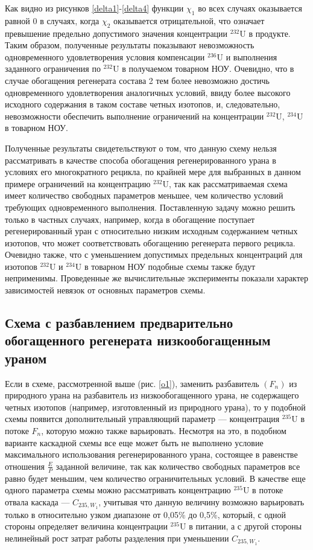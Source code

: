 Как видно из рисунков \ref{delta1}-\ref{delta4} функции $\chi_1$ во всех случаях оказывается равной 0 в случаях, когда $\chi_2$ оказывается отрицательной, что означает превышение предельно допустимого значения концентрации $^{232}$U в продукте. Таким образом, полученные результаты показывают невозможность одновременного удовлетворения условия компенсации $^{236}$U и выполнения заданного ограничения по $^{232}$U в получаемом товарном НОУ. Очевидно, что в случае обогащения регенерата состава 2 тем более невозможно достичь одновременного удовлетворения аналогичных условий, ввиду более высокого исходного содержания в таком составе четных изотопов, и, следовательно, невозможности обеспечить выполнение ограничений на концентрации $^{232}$U, $^{234}$U в товарном НОУ. 

Полученные результаты свидетельствуют о том, что данную схему нельзя рассматривать в качестве способа обогащения регенерированного урана в условиях его многократного рецикла, по крайней мере для выбранных в данном примере ограничений на концентрацию $^{232}$U, так как рассматриваемая схема имеет количество свободных параметров меньшее, чем количество условий требующих одновременного выполнения. Поставленную задачу можно решить только в частных случаях, например, когда в обогащение поступает регенерированный уран с относительно низким исходным содержанием четных изотопов, что может соответствовать обогащению регенерата первого рецикла. Очевидно также, что с уменьшением допустимых предельных концентраций для изотопов $^{232}$U и $^{234}$U в товарном НОУ подобные схемы также будут неприменимы. Проведенные же вычислительные эксперименты показали характер зависимостей невязок от основных параметров схемы.

\subsection{Схема с разбавлением предварительно обогащенного регенерата низкообогащенным ураном}\label{ch2_1_1}

Если в схеме, рассмотренной выше (рис. \ref{o1}), заменить разбавитель $(F_n)$ из природного урана на разбавитель из низкообогащенного урана, не содержащего четных изотопов (например, изготовленный из природного урана), то у подобной схемы появится дополнительный управляющий параметр --- концентрация $^{235}$U в потоке $F_n$, которую можно также варьировать. Несмотря на это, в подобном варианте каскадной схемы все еще может быть не выполнено условие максимального использования регенерированного урана, состоящее в равенстве отношения $\frac{E}{P}$ заданной величине, так как количество свободных параметров все равно будет меньшим, чем количество ограничительных условий. В качестве еще одного параметра схемы можно рассматривать концентрацию $^{235}$U в потоке отвала каскада --- $C_{235, W_1}$, учитывая что данную величину возможно варьировать только в относительно узком диапазоне от 0,05\% до 0,5\%, который, с одной стороны определяет величина концентрации $^{235}$U в питании, а с другой стороны нелинейный рост затрат работы разделения при уменьшении $C_{235, W_1}$. 

